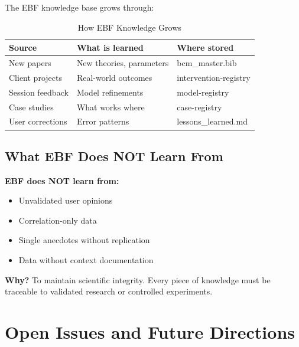The EBF knowledge base grows through:

\begin{table}[htbp]
\centering
\caption{How EBF Knowledge Grows}
\label{tab:knowledge-growth}
\renewcommand{\arraystretch}{1.3}
\begin{tabular}{@{}lll@{}}
\toprule
\textbf{Source} & \textbf{What is learned} & \textbf{Where stored} \\
\midrule
New papers & New theories, parameters & bcm\_master.bib \\
Client projects & Real-world outcomes & intervention-registry \\
Session feedback & Model refinements & model-registry \\
Case studies & What works where & case-registry \\
User corrections & Error patterns & lessons\_learned.md \\
\bottomrule
\end{tabular}
\end{table}

\subsection{What EBF Does NOT Learn From}

\begin{tcolorbox}[colback=red!5!white, colframe=red!75!black]
\textbf{EBF does NOT learn from:}
\begin{itemize}[nosep]
\item Unvalidated user opinions
\item Correlation-only data
\item Single anecdotes without replication
\item Data without context documentation
\end{itemize}

\textbf{Why?} To maintain scientific integrity. Every piece of knowledge
must be traceable to validated research or controlled experiments.
\end{tcolorbox}


\section{Open Issues and Future Directions}
\label{sec:ref-ebf-open}

